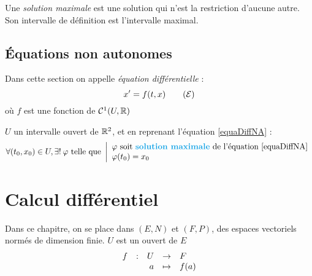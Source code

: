 \documentclass[11pt,a4paper,fleqn,pdftex]{report}
\begin{document}
Une \emph{solution maximale} est une solution qui n'est la restriction d'aucune autre. Son intervalle de définition est l'intervalle maximal.

\section{Équations non autonomes}
Dans cette section on appelle \emph{équation différentielle} : 
\begin{equation}\label{equaDiffNA}
x' = f(t,x)\tag{$\mathcal{E}$}
\end{equation}
où $f$ est une fonction de $\mathcal{C}^1(U,\mathbb{R})$
\begin{theorem}
$U$ un intervalle ouvert de $\mathbb{R}{}^2$, et en reprenant l'équation \eqref{equaDiffNA} : 
\[
    \forall (t_0,x_0) \in U, \exists ! \: \varphi \text{ telle que }
    \left|
    \begin{array}{l}
        \varphi \text{ soit \emph{solution maximale} de l'équation \eqref{equaDiffNA}}\\
        \varphi(t_0)=x_0
    \end{array}
    \right.
\]
\end{theorem}
%
%
\chapter{Calcul différentiel} %
\label{cha:calcul_differentiel}
Dans ce chapitre, on se place dans $\left( E, N \right)$ et $\left( F,P \right)$, des espaces vectoriels normés de dimension finie. $U$ est un ouvert de $E$
\[
    \begin{array}{r c r c l}
    f&:& U &\to & F \\
     & & a &\mapsto & f(a)
    \end{array}
\]
\end{document}
